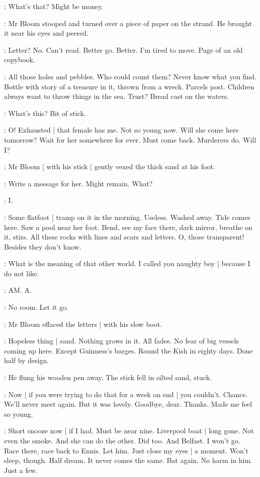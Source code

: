 \BloomCurrent:
What's that?
Might be money.

:
Mr Bloom stooped
and turned over a piece of paper
on the strand.
He brought it near his eyes and peered.

\BloomCurrent:
Letter?
No.
Can't read.
Better go.
Better.
I'm tired to move.
Page of an old copybook.

\BloomAbstract:
All those holes and pebbles.
Who could count them?
Never know what you find.
Bottle with story of a treasure in it,
thrown from a wreck.%
Parcels post.
Children always want to throw things in the sea.
Trust?
Bread cast on the waters.

\BloomCurrent:
What's this?
Bit of stick.

\BloomCurrent:
O!
Exhausted |
that female has me.
Not so young now.
Will she come here tomorrow?
Wait for her somewhere for ever.
Must come back.
Murderers do.
Will I?

:
Mr Bloom |
with his stick |
gently vexed the thick sand at his foot.

\BloomCurrent:
Write a message for her.
Might remain.
What?

\BloomCurrent:
I.

\BloomCurrent:
Some flatfoot |
tramp on it in the morning.
Useless.
Washed away.
Tide comes here.%
Saw a pool near her foot.
Bend,
see my face there,
dark mirror,
breathe on it,
stirs.
All these rocks
with lines and scars and letters.
O,
those transparent!
Besides
they don't know.

\BloomToday:
What is the meaning of that other world.
I called you naughty boy |
because I do not like.

\BloomCurrent:
AM.
A.

\BloomCurrent:
No room.
Let it go.

:
Mr Bloom effaced the letters |
with his slow boot.

\BloomAbstract:
Hopeless thing |
sand.
Nothing grows in it.
All fades.
No fear of big vessels coming up here.
Except Guinness's barges.
Round the Kish in eighty days.
Done half by design.

:
He flung his wooden pen away.%
The stick fell in silted sand,
stuck.

\BloomCurrent:
Now |
if you were trying to do that for a week on end |
you couldn't.
Chance.
We'll never meet again.
But it was lovely.
Goodbye,
dear.
Thanks.
Made me feel so young.

\BloomCurrent:
Short snooze now |
if I had.
Must be near nine.
Liverpool boat |
long gone.
Not even the smoke.
And she can do the other.
Did too.
And Belfast.
I won't go.
Race there,
race back to Ennis.
Let him.
Just close my eyes |
a moment.
Won't sleep,
though.
Half dream.
It never comes the same.
Bat again.
No harm in him.
Just a few.

